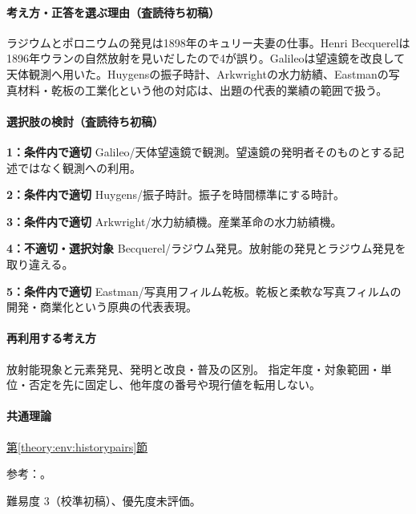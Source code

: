 \paragraph{考え方・正答を選ぶ理由（査読待ち初稿）} ラジウムとポロニウムの発見は1898年のキュリー夫妻の仕事。Henri Becquerelは1896年ウランの自然放射を見いだしたので4が誤り。Galileoは望遠鏡を改良して天体観測へ用いた。Huygensの振子時計、Arkwrightの水力紡績、Eastmanの写真材料・乾板の工業化という他の対応は、出題の代表的業績の範囲で扱う。

\paragraph{選択肢の検討（査読待ち初稿）}\mbox{}\par

\noindent\textbf{1：条件内で適切} Galileo/天体望遠鏡で観測。望遠鏡の発明者そのものとする記述ではなく観測への利用。\par

\noindent\textbf{2：条件内で適切} Huygens/振子時計。振子を時間標準にする時計。\par

\noindent\textbf{3：条件内で適切} Arkwright/水力紡績機。産業革命の水力紡績機。\par

\noindent\textbf{4：不適切・選択対象} Becquerel/ラジウム発見。放射能の発見とラジウム発見を取り違える。\par

\noindent\textbf{5：条件内で適切} Eastman/写真用フィルム乾板。乾板と柔軟な写真フィルムの開発・商業化という原典の代表表現。\par

\paragraph{再利用する考え方} 放射能現象と元素発見、発明と改良・普及の区別。 指定年度・対象範囲・単位・否定を先に固定し、他年度の番号や現行値を転用しない。

\paragraph{共通理論} \hyperref[theory:env:historypairs]{第\ref*{theory:env:historypairs}節}

\par 参考：\cite{env58_curie}。

\par 難易度 3（校準初稿）、優先度未評価。

